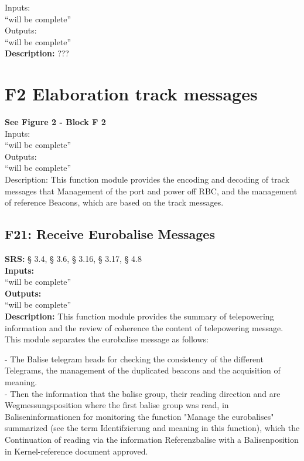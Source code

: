 \documentclass{template/openetcs_report}
\begin{document}
  Inputs:\\
``will be complete''\\

 Outputs:\\
 ``will be complete''\\
 
 \textbf{ Description:} ???
 

 \section{F2 Elaboration track messages}
 
 \textbf{See Figure 2 - Block F 2}\\
 
  Inputs:\\
``will be complete''\\

 Outputs:\\
 ``will be complete''\\
 
 Description: This function module provides the encoding and decoding of track messages that 
Management of the port and power off RBC, and the management of reference 
Beacons, which are based on the track messages.\\

 \subsection{	F21: Receive Eurobalise Messages} 
 \textbf{SRS:} § 3.4, § 3.6, § 3.16, § 3.17, § 4.8\\
 
  \textbf{Inputs:}\\
``will be complete''\\

 \textbf{Outputs:}\\
 ``will be complete''\\
 
 \textbf{Description:} 
 This function module provides the summary of telepowering information and the 
review of coherence the content of telepowering message. 
This module separates the eurobalise message as follows: 
 
 - The Balise telegram heads for checking the consistency of the different 
Telegrams, the management of the duplicated beacons and the acquisition of meaning. \\

- Then the information that the balise group, their reading direction and are 
Wegmessungsposition where the first balise group was read, in 
Baliseninformationen for monitoring the function "Manage the eurobalises" 
summarized (see the term Identifzierung and meaning in this function), which the 
Continuation of reading via the information Referenzbalise with a Balisenposition in 
Kernel-reference document approved. \\
\end{document}
